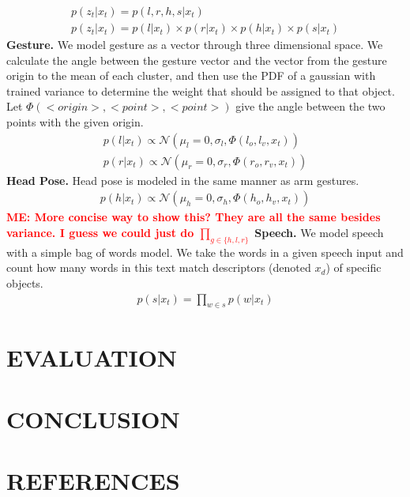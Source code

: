 \documentclass[letterpaper, 10 pt, conference]{ieeeconf}
\newcommand{\menote}[1]{\textcolor{Red}{\textbf{ME: #1}}}
\begin{document}
\begin{align}
p(z_t | x_t) = p(l, r, h, s | x_t)\\
p(z_t | x_t) = p(l | x_t) \times p(r | x_t) \times p(h | x_t) \times p(s | x_t)
\end{align}
{\bf Gesture.}  We model gesture as a vector through three dimensional space. We calculate the angle between the gesture vector and the vector from the gesture origin to the mean of each cluster, and then use the PDF of a gaussian with trained variance to determine the weight that should be assigned to that object. Let $\Phi(<origin>, <point>, <point>)$ give the angle between the two points with the given origin.
\begin{align}
p(l | x_t) \propto \mathcal{N}(\mu_l=0, \sigma_l,\Phi(l_o, l_v, x_t))\\
p(r | x_t) \propto \mathcal{N}(\mu_r=0, \sigma_r,\Phi(r_o, r_v, x_t))
\end{align}
{\bf Head Pose.}
Head pose is modeled in the same manner as arm gestures.
\begin{align}
p(h | x_t) \propto \mathcal{N}(\mu_h=0, \sigma_h,\Phi(h_o, h_v, x_t))
\end{align}
\menote{More concise way to show this? They are all the same besides variance. I guess we could just do $\prod_{g\in\{h,l,r\}}$}
{\bf Speech.}
We model speech with a simple bag of words model. We take the words in a given speech input and count how many words in this text match descriptors (denoted  $x_d$) of specific objects.
\begin{align}
p(s |x_t) = \displaystyle \prod_{w \in s} p(w | x_t)
\end{align}


\section{EVALUATION}

\section{CONCLUSION}

\section{REFERENCES}


\end{document}
